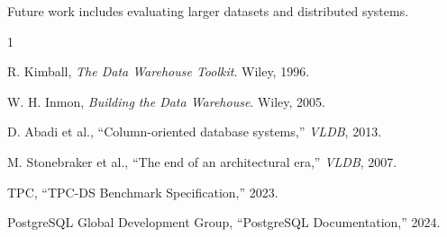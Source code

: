 \documentclass[conference]{IEEEtran}
\begin{document}
Future work includes evaluating larger datasets and distributed systems.

\begin{thebibliography}{1}

R. Kimball, \textit{The Data Warehouse Toolkit}. Wiley, 1996.

W. H. Inmon, \textit{Building the Data Warehouse}. Wiley, 2005.

D. Abadi et al., “Column-oriented database systems,” \textit{VLDB}, 2013.

M. Stonebraker et al., “The end of an architectural era,” \textit{VLDB}, 2007.

TPC, “TPC-DS Benchmark Specification,” 2023.

PostgreSQL Global Development Group, “PostgreSQL Documentation,” 2024.

\end{thebibliography}
\end{document}
